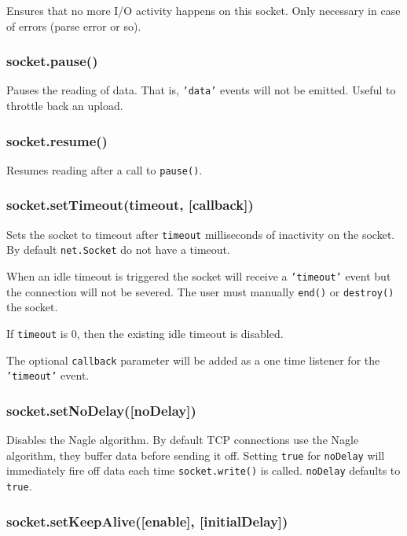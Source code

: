 Ensures that no more I/O activity happens on this socket. Only necessary
in case of errors (parse error or so).

\subsubsection{socket.pause()}

Pauses the reading of data. That is, \texttt{'data'} events will not be
emitted. Useful to throttle back an upload.

\subsubsection{socket.resume()}

Resumes reading after a call to \texttt{pause()}.

\subsubsection{socket.setTimeout(timeout, {[}callback{]})}

Sets the socket to timeout after \texttt{timeout} milliseconds of
inactivity on the socket. By default \texttt{net.Socket} do not have a
timeout.

When an idle timeout is triggered the socket will receive a
\texttt{'timeout'} event but the connection will not be severed. The
user must manually \texttt{end()} or \texttt{destroy()} the socket.

If \texttt{timeout} is 0, then the existing idle timeout is disabled.

The optional \texttt{callback} parameter will be added as a one time
listener for the \texttt{'timeout'} event.

\subsubsection{socket.setNoDelay({[}noDelay{]})}

Disables the Nagle algorithm. By default TCP connections use the Nagle
algorithm, they buffer data before sending it off. Setting \texttt{true}
for \texttt{noDelay} will immediately fire off data each time
\texttt{socket.write()} is called. \texttt{noDelay} defaults to
\texttt{true}.

\subsubsection{socket.setKeepAlive({[}enable{]}, {[}initialDelay{]})}

